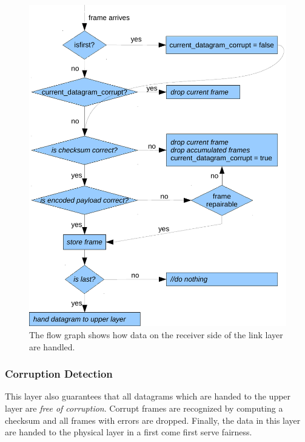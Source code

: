   \begin{figure}[h]
  \centering
  \includegraphics[scale=0.6]{images/flowgraph_link_layer_receiver.pdf}
  \caption[Receiver side of link layer]{ The flow graph shows how data on the receiver side of the link layer are handled.}
  \label{fig:receiver-side-link-layer}
\end{figure}

  \subsubsection{Corruption Detection}
  This layer also guarantees that all datagrams which are handed to the upper layer are \emph{free of corruption}. Corrupt frames are recognized by computing a checksum and all frames with errors are dropped.  Finally, the data in this layer are handed to the physical layer in a first come first serve fairness. 

